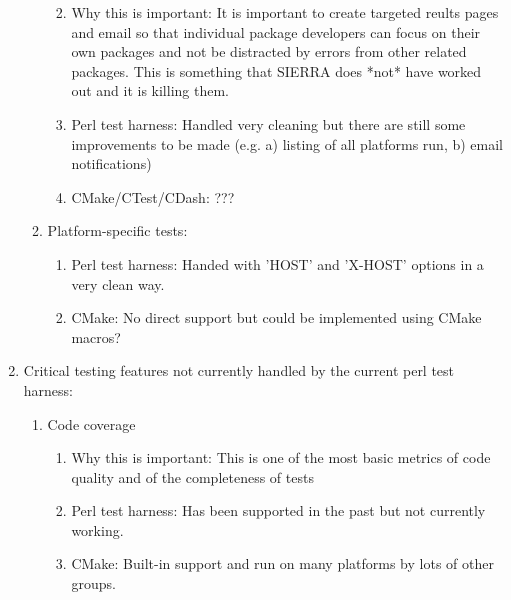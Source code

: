 \documentclass[pdf,ps2pdf,11pt]{SANDreport}
\begin{document}
\begin{enumerate}
\begin{enumerate}
\begin{enumerate}
    {}\item Why this is important: It is important to create targeted
    reults pages and email so that individual package developers can
    focus on their own packages and not be distracted by errors from
    other related packages.  This is something that SIERRA does *not*
    have worked out and it is killing them.

    {}\item Perl test harness: Handled very cleaning but there are
    still some improvements to be made (e.g. a) listing of all
    platforms run, b) email notifications)

    {}\item CMake/CTest/CDash: ???

    \end{enumerate}

  {}\item Platform-specific tests:

    \begin{enumerate}

    {}\item Perl test harness: Handed with 'HOST' and 'X-HOST' options
    in a very clean way.

    {}\item CMake: No direct support but could be implemented using
    CMake macros?

    \end{enumerate}

  \end{enumerate}

{}\item Critical testing features not currently handled by the current
perl test harness:

  \begin{enumerate}

  {}\item Code coverage

    \begin{enumerate}

    {}\item Why this is important: This is one of the most basic
    metrics of code quality and of the completeness of tests

    {}\item Perl test harness: Has been supported in the past but not
    currently working.

    {}\item CMake: Built-in support and run on many platforms by lots
    of other groups.


\end{enumerate}
\end{enumerate}
\end{enumerate}
\end{document}
